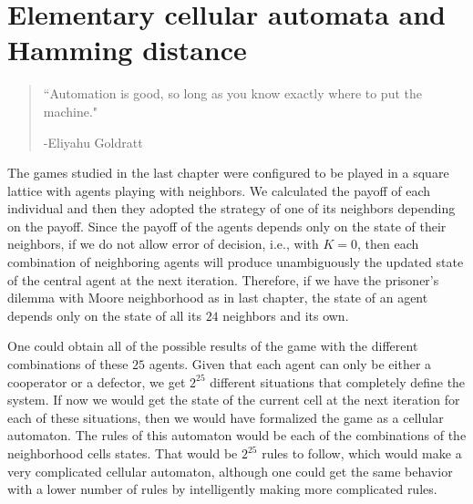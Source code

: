 \chapter{Elementary cellular automata and Hamming distance}
\label{chap:HammingECA}


\begin{quotation}
	\vspace{-3cm}
    \begin{flushright}
    \begin{minipage}[t][5cm][b]{0.5\textwidth}
    { ``Automation is good, so long as you know exactly where to put the machine."}
    
    \bigskip
    
    -{\small  Eliyahu Goldratt}
    \end{minipage}
    \end{flushright}
    
    \vspace{0.5cm}
\end{quotation}



The games studied in the last chapter were configured to be played in a square lattice with agents playing with neighbors. We calculated the payoff of each individual and then they adopted the strategy of one of its neighbors depending on the payoff. Since the payoff of the agents depends only on the state of their neighbors, if we do not allow error of decision, i.e., with $K=0$, then each combination of neighboring agents will produce unambiguously the updated state of the central agent at the next iteration. Therefore, if we have the prisoner's dilemma with Moore neighborhood as in last chapter, the state of an agent depends only on the state of all its $24$ neighbors and its own. 

One could obtain all of the possible results of the game with the different combinations of these $25$ agents. Given that each agent can only be either a cooperator or a defector, we get $2^{25}$ different situations that completely define the system. If now we would get the state of the current cell at the next iteration for each of these situations, then we would have formalized the game as a cellular automaton. The rules of this automaton would be each of the combinations of the neighborhood cells states. That would be $2^{25}$ rules to follow, which would make a very complicated cellular automaton, although one could get the same behavior with a lower number of rules by intelligently making more complicated rules. 

